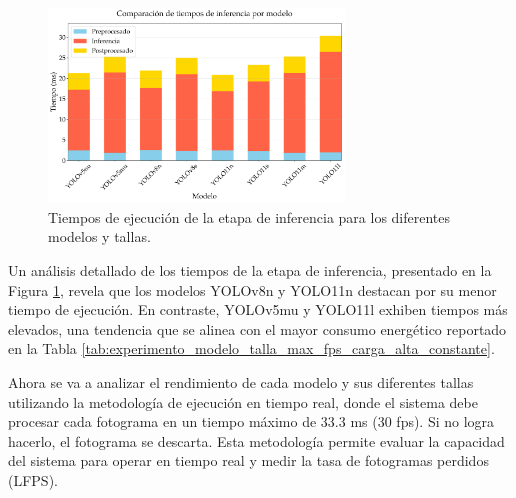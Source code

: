 \documentclass[11pt,spanish,listoffigures,listoftables]{tfgetsinf}
\begin{document}
\begin{figure}[H]
   \centering
   \includegraphics[width=0.7\textwidth]{excels/inferencia/modelo_talla/tiempos_inferencia/tiempos_inferencia.pdf}
   \caption[Tiempos de ejecución de la etapa de inferencia para los diferentes modelos y tallas]{Tiempos de ejecución de la etapa de inferencia para los diferentes modelos y tallas.}
   \label{fig:tiempos_inferencia}
\end{figure}
Un análisis detallado de los tiempos de la etapa de inferencia, presentado en la Figura \ref{fig:tiempos_inferencia}, revela que los modelos YOLOv8n y YOLO11n destacan por su menor tiempo de ejecución. En contraste, YOLOv5mu y YOLO11l exhiben tiempos más elevados, una tendencia que se alinea con el mayor consumo energético reportado en la Tabla \ref{tab:experimento_modelo_talla_max_fps_carga_alta_constante}.

Ahora se va a analizar el rendimiento de cada modelo y sus diferentes tallas utilizando la metodología de ejecución en tiempo real, donde el sistema debe procesar cada fotograma en un tiempo máximo de 33.3 ms (30 fps). Si no logra hacerlo, el fotograma se descarta. Esta metodología permite evaluar la capacidad del sistema para operar en tiempo real y medir la tasa de fotogramas perdidos (LFPS).
\end{document}
